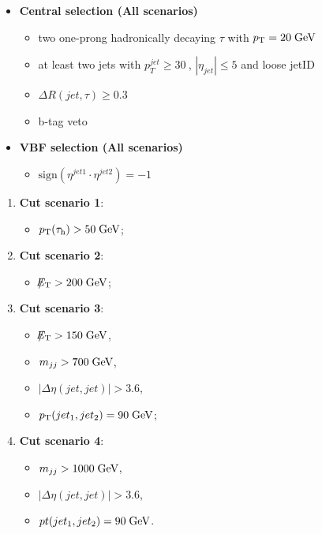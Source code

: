 \begin{itemize}
	\item \textbf{Central selection (All scenarios)}
	\begin{itemize}
		\item two one-prong hadronically decaying $\tau$ with $p_{\text{T}} = 20\;\text{Ge}\kern-0.06667em\text{V}$
		\item at least two jets with $p_{T}^{jet}\geq30~$\gev, $|\eta_{jet}|\leq5$ and loose jetID
		\item $\Delta R(jet,\tau)\geq0.3$
		\item b-tag veto
	\end{itemize}
	\item \textbf{VBF selection (All scenarios)}
	\begin{itemize}
		\item $\text{sign}(\eta^{jet 1}\cdot\eta^{jet 2})=-1$
	\end{itemize}
\end{itemize}

\begin{enumerate}
	\item \textbf{Cut scenario 1}: 
		\begin{itemize}
		\item $p_{\text{T}}(\tau_{\text{h}}) > 50\;\text{Ge}\kern-0.06667em\text{V}$;
	\end{itemize}

	\item \textbf{Cut scenario 2}: 
	\begin{itemize}
		\item 	$\slash\mkern-12mu{E}_{\text{T}} > 200\;\text{Ge}\kern-0.06667em\text{V}$;
	\end{itemize}

	\item \textbf{Cut scenario 3}: 
	\begin{itemize}
		\item $\slash\mkern-12mu{E}_{\text{T}} > 150\;\text{Ge}\kern-0.06667em\text{V}$,
		\item $m_{jj} > 700\;\text{Ge}\kern-0.06667em\text{V}$, 
		\item $|\Delta\eta(jet,jet)| > 3.6$,
		\item $p_{\text{T}}(jet_{1},jet_{2}) = 90\;\text{Ge}\kern-0.06667em\text{V}$;
	\end{itemize}
	
	\item \textbf{Cut scenario 4}: 			
	\begin{itemize}
		\item $m_{jj} > 1000\;\text{Ge}\kern-0.06667em\text{V}$, 
		\item $|\Delta\eta(jet,jet)| > 3.6$,
		\item $pt (jet_{1},jet_{2}) = 90\;\text{Ge}\kern-0.06667em\text{V}$.
	\end{itemize}
\end{enumerate}

